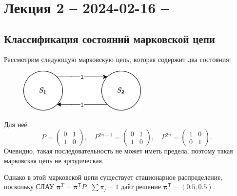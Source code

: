 \section{Лекция 2 -- 2024-02-16 -- }
\subsection{Классификация состояний марковской цепи}
\begin{ex}
  Рассмотрим следующую марковскую цепь, которая содержит два состояния:
  \begin{figure}[h!]
    \centering
    \includegraphics[width=0.3\linewidth]{stoproc/Figures/lec2-ex1}
  \end{figure}
 
  Для неё
  \[
    P = \begin{pmatrix}
      0 & 1 \\
      1 & 0
    \end{pmatrix}, \quad
    P^{2n + 1} = \begin{pmatrix}
      0 & 1 \\
      1 & 0
    \end{pmatrix}, \quad
    P^{2n} = \begin{pmatrix}
      1 & 0 \\
      0 & 1
    \end{pmatrix}.
  \]
  Очевидно, такая последовательность не может иметь предела, поэтому такая марковская цепь не
  эргодическая.

  Однако в этой марковской цепи существует стационарное распределение, поскольку СЛАУ
  $\bm\pi^T = \bm\pi^{\mathsf T} P;\ \sum \pi_j = 1$ даёт решение
  $\bm\pi^{\mathsf T} = (0.5, 0.5)$.
\end{ex}

